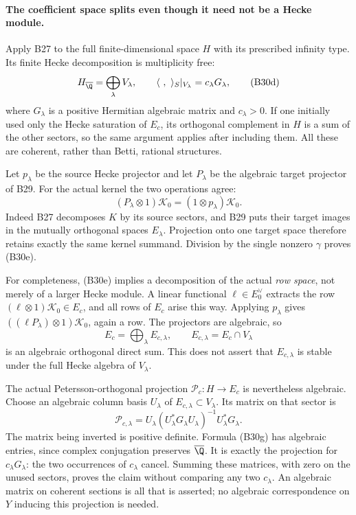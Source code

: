 \paragraph{The coefficient space splits even though it need not be a Hecke module.}
Apply B27 to the full finite-dimensional space $H$ with its prescribed
infinity type.  Its finite Hecke decomposition is multiplicity free:
\[
 H_{\overline\Q}=\bigoplus_\lambda V_\lambda,
       \qquad \langle\ ,\ \rangle_S|_{V_\lambda}
                                  =c_\lambda G_\lambda,
 \tag{B30d}
\]
where $G_\lambda$ is a positive Hermitian algebraic matrix and
$c_\lambda>0$.  If one initially used only the Hecke saturation of
$E_c$, its orthogonal complement in $H$ is a sum of the other
sectors, so the same argument applies after including them.
All these are coherent, rather than Betti, rational structures.

Let $p_\lambda$ be the source Hecke projector and let
$P_\lambda$ be the algebraic target projector of B29.
For the actual kernel the two operations agree:
\[
 (P_\lambda\otimes1)\mathcal K_0
                  =(1\otimes p_\lambda)\mathcal K_0.
 \tag{B30e}
\]
Indeed B27 decomposes $K$ by its source sectors, and B29 puts their
target images in the mutually orthogonal spaces $E_\lambda$.
Projection onto one target space therefore retains exactly the same
kernel summand.  Division by the single nonzero $\gamma$ proves
(B30e).

For completeness, (B30e) implies a decomposition of the actual
\emph{row space}, not merely of a larger Hecke module.  A linear
functional $\ell\in E_0^\vee$ extracts the row
$(\ell\otimes1)\mathcal K_0\in E_c$, and all rows of $E_c$
arise this way.  Applying $p_\lambda$ gives
$((\ell P_\lambda)\otimes1)\mathcal K_0$, again a row.
The projectors are algebraic, so
\[
                E_c=\bigoplus_\lambda E_{c,\lambda},
                   \qquad E_{c,\lambda}=E_c\cap V_\lambda
 \tag{B30f}
\]
is an algebraic orthogonal direct sum.  This does not assert that
$E_{c,\lambda}$ is stable under the full Hecke algebra of $V_\lambda$.

The actual Petersson-orthogonal projection
$\mathcal P_c:H\longrightarrow E_c$ is nevertheless algebraic.
Choose an algebraic column basis $U_\lambda$ of
$E_{c,\lambda}\subset V_\lambda$.  Its matrix on that sector is
\[
 \mathcal P_{c,\lambda}
     =U_\lambda(U_\lambda^*G_\lambda U_\lambda)^{-1}
                         U_\lambda^*G_\lambda.
 \tag{B30g}
\]
The matrix being inverted is positive definite.  Formula (B30g)
has algebraic entries, since complex conjugation preserves
$\overline\Q$.  It is exactly the projection for
$c_\lambda G_\lambda$: the two occurrences of $c_\lambda$
cancel.  Summing these matrices, with zero on the unused sectors,
proves the claim without comparing any two $c_\lambda$.
An algebraic matrix on coherent sections is all that is asserted;
no algebraic correspondence on $Y$ inducing this projection is needed.

